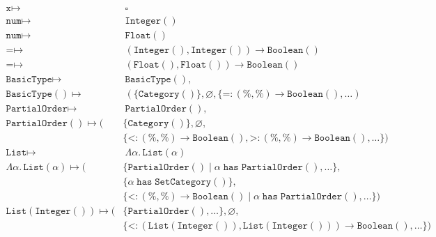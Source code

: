 \documentclass[10pt]{article}
\newcommand\Category{\texttt{Category}}
\newcommand\TyHas{\;\texttt{has}\;}
\newcommand\Guard{\;|\;}
\newcommand\BasicType{\texttt{BasicType}}
\newcommand\PartialOrder{\texttt{PartialOrder}}
\newcommand\SetCategory{\texttt{SetCategory}}
\newcommand\Integer{\texttt{Integer}}
\newcommand\Float{\texttt{Float}}
\newcommand\Boolean{\texttt{Boolean}}
\newcommand\List{\texttt{List}}
\begin{document}
\begin{table}[!h]
  \begin{align*}
    \texttt{x} \mapsto &\ \square
    \\[0.5em]
    \texttt{num} \mapsto &\ \Integer() \\
    \texttt{num} \mapsto &\ \Float()
    \\[0.5em]
    \texttt{=} \mapsto &\ (\Integer(), \Integer()) \rightarrow \Boolean() \\
    \texttt{=} \mapsto &\ (\Float(), \Float()) \rightarrow \Boolean()
    \\[0.5em]
    \BasicType \mapsto &\ \BasicType(), \\
    \BasicType() \mapsto &\ ( \{ \Category() \}, \varnothing,
      \{ \texttt{=} : (\%,\%) \rightarrow \Boolean(), \ldots )
    \\[0.5em]
    \PartialOrder \mapsto &\ \PartialOrder(), \\
    \PartialOrder() \mapsto ( & \{ \Category() \}, \varnothing, \\
    & \{ \texttt{<} : (\%,\%) \rightarrow \Boolean(),
         \texttt{>} : (\%,\%) \rightarrow \Boolean(), \ldots \} )
    \\[0.5em]
    \List \mapsto &\ \Lambda \alpha.\,\List(\alpha) \\
    \Lambda \alpha.\, \List(\alpha) \mapsto ( &
      \{\PartialOrder() \Guard \alpha \TyHas \PartialOrder(), \ldots \}, \\
    & \{ \alpha \TyHas \SetCategory() \}, \\
    & \{ \texttt{<} : (\%,\%) \rightarrow \Boolean() \Guard \alpha \TyHas
      \PartialOrder(), \ldots \} ) \\
    \List(\Integer()) \mapsto ( & \{ \PartialOrder(), \ldots \}, \varnothing, \\
    & \{ \texttt{<} : (\List(\Integer()),\List(\Integer())) \rightarrow
      \Boolean(), \ldots \} ) \\
  \end{align*}

  \vspace{2em}

  \begin{prooftree}
  \end{prooftree}

  \begin{prooftree}
  \end{prooftree}
\end{table}
\end{document}
